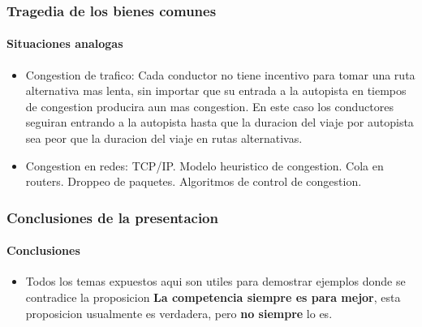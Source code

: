 \documentclass{beamer}
\begin{document}
\begin{frame}
  \frametitle{Tragedia de los bienes comunes}
  \framesubtitle{Situaciones analogas}
  \begin{itemize}
    \setlength{\itemsep}{5pt}    
    \item Congestion de trafico: Cada conductor no tiene incentivo para tomar una ruta alternativa mas lenta, sin importar que su entrada a la autopista en tiempos de congestion producira aun mas congestion. En este caso los conductores seguiran entrando a la autopista hasta que la duracion del viaje por autopista sea peor que la duracion del viaje en rutas alternativas.
    \pause
    \item Congestion en redes: TCP/IP. Modelo heuristico de congestion. Cola en routers. Droppeo de paquetes. Algoritmos de control de congestion.
  \end{itemize}
\end{frame}

\begin{frame}
  \frametitle{Conclusiones de la presentacion}
  \framesubtitle{Conclusiones}
  \begin{itemize}
    \setlength{\itemsep}{5pt}    
    \item Todos los temas expuestos aqui son utiles para demostrar ejemplos donde se contradice la proposicion \textbf{La competencia siempre es para mejor}, esta proposicion usualmente es verdadera, pero \textbf{no siempre} lo es.
  \end{itemize}
\end{frame}
\end{document}

